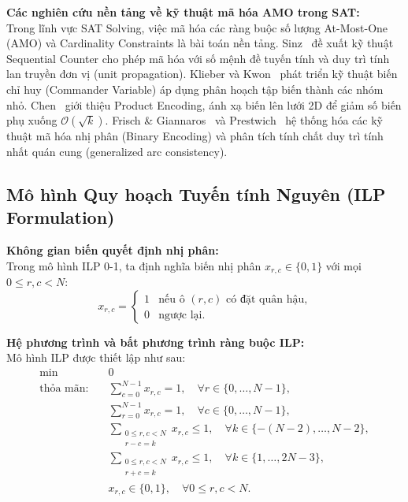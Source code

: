 \documentclass[11pt,a4paper]{article}
\begin{document}
\noindent\textbf{Các nghiên cứu nền tảng về kỹ thuật mã hóa AMO trong SAT:}\\
Trong lĩnh vực SAT Solving, việc mã hóa các ràng buộc số lượng At-Most-One (AMO) và Cardinality Constraints là bài toán nền tảng. Sinz~\cite{sinz2005towards} đề xuất kỹ thuật Sequential Counter cho phép mã hóa với số mệnh đề tuyến tính và duy trì tính lan truyền đơn vị (unit propagation). Klieber và Kwon~\cite{klieber2007efficient} phát triển kỹ thuật biến chỉ huy (Commander Variable) áp dụng phân hoạch tập biến thành các nhóm nhỏ. Chen~\cite{chen2010product} giới thiệu Product Encoding, ánh xạ biến lên lưới 2D để giảm số biến phụ xuống $\mathcal{O}(\sqrt{k})$. Frisch \& Giannaros~\cite{frisch2010sat} và Prestwich~\cite{prestwich2009cnf} hệ thống hóa các kỹ thuật mã hóa nhị phân (Binary Encoding) và phân tích tính chất duy trì tính nhất quán cung (generalized arc consistency).

\subsection{Mô hình Quy hoạch Tuyến tính Nguyên (ILP Formulation)}

\noindent\textbf{Không gian biến quyết định nhị phân:}\\
Trong mô hình ILP 0-1, ta định nghĩa biến nhị phân $x_{r,c} \in \{0, 1\}$ với mọi $0 \le r, c < N$:
\begin{equation}
    x_{r,c} = \begin{cases}
        1 & \text{nếu ô } (r, c) \text{ có đặt quân hậu,} \\
        0 & \text{ngược lại.}
    \end{cases}
\end{equation}

\noindent\textbf{Hệ phương trình và bất phương trình ràng buộc ILP:}\\
Mô hình ILP được thiết lập như sau:
\begin{align}
    \min \quad & 0 \label{eq:ilp-obj}\\
    \text{thỏa mãn:} \quad
    & \sum_{c=0}^{N-1} x_{r,c} = 1, \quad \forall r \in \{0, \dots, N-1\}, \label{eq:ilp-row}\\
    & \sum_{r=0}^{N-1} x_{r,c} = 1, \quad \forall c \in \{0, \dots, N-1\}, \label{eq:ilp-col}\\
    & \sum_{\substack{0 \le r, c < N \\ r - c = k}} x_{r,c} \le 1, \quad \forall k \in \{-(N-2), \dots, N-2\}, \label{eq:ilp-diag1}\\
    & \sum_{\substack{0 \le r, c < N \\ r + c = k}} x_{r,c} \le 1, \quad \forall k \in \{1, \dots, 2N-3\}, \label{eq:ilp-diag2}\\
    & x_{r,c} \in \{0, 1\}, \quad \forall 0 \le r, c < N. \label{eq:ilp-domain}
\end{align}
\end{document}

